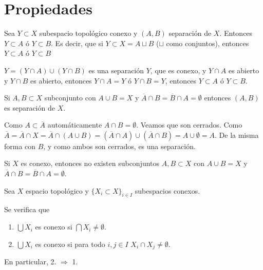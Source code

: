 \section{Propiedades}
\begin{prop}
    Sea $Y \subset X$ subespacio topol\'ogico conexo y $(A,B)$ separaci\'on de $X$. Entonces $Y \subset A$ \'o $Y \subset B$. Es decir, que si $Y \subset X = A\sqcup B$ ($\sqcup$ como conjuntos), entonces $Y \subset A$ \'o $Y\subset B$
\end{prop}
\begin{dem}
    $Y = (Y\cap A ) \cup (Y \cap B)$ es una separaci\'on $Y$, que es conexo, y $Y\cap A $ es abierto y $Y\cap B$ es abierto, entonces $Y\cap A = Y$ \'o $Y\cap B = Y$, entonces $Y \subset A$ \'o $Y\subset B$.  
\end{dem}
\begin{prop}
    Si $A,B \subset X$ subconjunto con $A \cup B = X$ y $\overline{A}\cap B = \overline{B}\cap A = \emptyset$ entonces $(A,B)$ es separaci\'on de $X$.
\end{prop}
\begin{dem}
    Como $A\subset \overline{A}$ autom\'aticamente $A \cap B = \emptyset$. Veamos que son cerrados. Como $\overline{A} = \overline A \cap X = \overline A \cap (A\cup B) = (\overline A \cap A) \cup (\overline A \cap B) = A \cup \emptyset = A$. De la misma forma con $B$, y como ambos son cerrados, es una separaci\'on.
\end{dem}
\begin{cor}
Si $X$ es conexo, entonces no existen subconjuntos $A,B \subset X$ con $A \cup B = X$ y $\overline A \cap B = \overline B \cap A = \emptyset$.
\end{cor}

Sea $X$ espacio topol\'ogico y $\{X_i \subset X\}_{i \in I}$ subespacios conexos.
\begin{ejer}
    Se verifica que
    \begin{enumerate}
        \item $\bigcup X_i$ es conexo si $\bigcap X_i \neq \emptyset$. 
        \item $\bigcup X_i$ es conexo si para todo $i, j\in I$ $X_i \cap X_j \neq \emptyset$.
    \end{enumerate} En particular, 2. $\Rightarrow$ 1.
\end{ejer}

